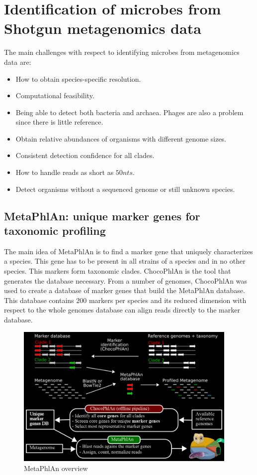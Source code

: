 \section{Identification of microbes from Shotgun metagenomics data}
The main challenges with respect to identifying microbes from metagenomics data are:

\begin{multicols}{2}
    \begin{itemize}
        \item How to obtain species-specific resolution.
        \item Computational feasibility.
        \item Being able to detect both bacteria and archaea.
            Phages are also a problem since there is little reference.
        \item Obtain relative abundances of organisms with different genome sizes.
        \item Consistent detection confidence for all clades.
        \item How to handle reads as short as $50nts$.
        \item Detect organisms without a sequenced genome or still unknown species.
    \end{itemize}
\end{multicols}

    \subsection{MetaPhlAn: unique marker genes for taxonomic profiling}
    The main idea of MetaPhlAn is to find a marker gene that uniquely characterizes a species.
    This gene has to be present in all strains of a species and in no other species.
    This markers form taxonomic clades.
    ChocoPhlAn is the tool that generates the database necessary.
    From a number of genomes, ChocoPhlAn was used to create a database of marker genes that build the MetaPhlAn database.
    This database contains $200$ markers per species and its reduced dimension with respect to the whole genomes database can align reads directly to the marker database.

    \begin{figure}[!h]
        \centering
        \includegraphics[width=0.95\textwidth]{MetaPhlAn.png}
        \caption{\label{fig:metaphlan}MetaPhlAn overview}
    \end{figure}


